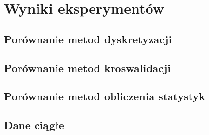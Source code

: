 \chapter{Wyniki eksperymentów}

\section{Porównanie metod dyskretyzacji}

\section{Porównanie metod kroswalidacji}

\section{Porównanie metod obliczenia statystyk}

\section{Dane ciągłe}